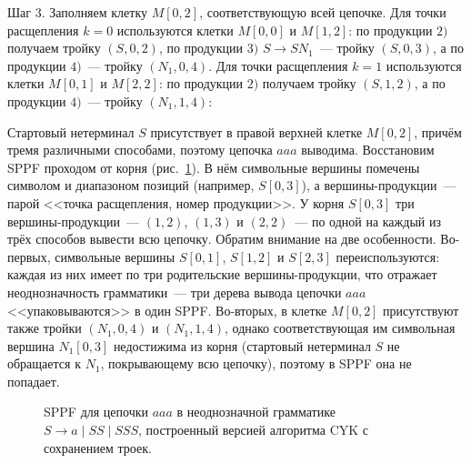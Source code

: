 \begin{example}
    Шаг 3.
    Заполняем клетку $M[0,2]$, соответствующую всей цепочке.
    Для точки расщепления $k = 0$ используются клетки $M[0,0]$ и $M[1,2]$: по продукции $2)$ получаем тройку $(S, 0, 2)$, по продукции $3)$ $S \to S N_1$~--- тройку $(S, 0, 3)$, а по продукции $4)$~--- тройку $(N_1, 0, 4)$.
    Для точки расщепления $k = 1$ используются клетки $M[0,1]$ и $M[2,2]$: по продукции $2)$ получаем тройку $(S, 1, 2)$, а по продукции $4)$~--- тройку $(N_1, 1, 4)$:
    \begin{center}
    \end{center}

    Стартовый нетерминал $S$ присутствует в правой верхней клетке $M[0,2]$, причём тремя различными способами, поэтому цепочка $a a a$ выводима.
    Восстановим SPPF проходом от корня (рис.~\ref{fig:sppf_cyk}).
    В нём символьные вершины помечены символом и диапазоном позиций (например, $S [0,3]$), а вершины-продукции~--- парой <<точка расщепления, номер продукции>>.
    У корня $S [0,3]$ три вершины-продукции~--- $(1,2)$, $(1,3)$ и $(2,2)$~--- по одной на каждый из трёх способов вывести всю цепочку.
    Обратим внимание на две особенности.
    Во-первых, символьные вершины $S [0,1]$, $S [1,2]$ и $S [2,3]$ переиспользуются: каждая из них имеет по три родительские вершины-продукции, что отражает неоднозначность грамматики~--- три дерева вывода цепочки $a a a$ <<упаковываются>> в один SPPF.
    Во-вторых, в клетке $M[0,2]$ присутствуют также тройки $(N_1, 0, 4)$ и $(N_1, 1, 4)$, однако соответствующая им символьная вершина $N_1 [0,3]$ недостижима из корня (стартовый нетерминал $S$ не обращается к $N_1$, покрывающему всю цепочку), поэтому в SPPF она не попадает.

    \begin{figure}
        \begin{center}
            \resizebox{0.8\textwidth}{!}{}
        \end{center}
        \caption{SPPF для цепочки $a a a$ в неоднозначной грамматике $S \to a \mid S S \mid S S S$, построенный версией алгоритма CYK с сохранением троек.}
        \label{fig:sppf_cyk}
    \end{figure}
\end{example}

